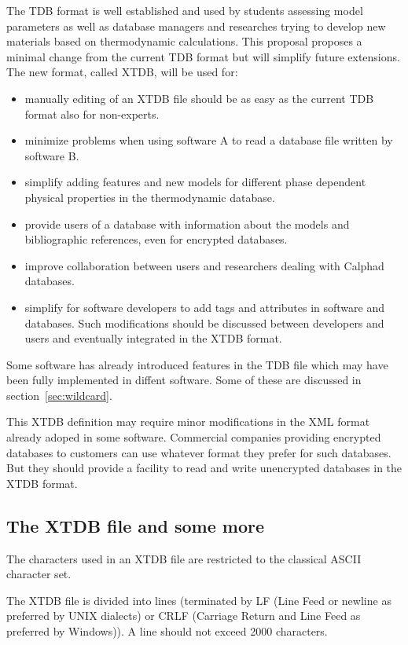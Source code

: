 \documentclass{article}
\begin{document}
The TDB format is well established and used by students assessing
model parameters as well as database managers and researches trying to
develop new materials based on thermodynamic calculations.  This
proposal proposes a minimal change from the current TDB format but
will simplify future extensions.  The new format, called XTDB, will be
used for:
\begin{itemize}
  \item manually editing of an XTDB file should be as easy as the
    current TDB format also for non-experts.
  \item minimize problems when using software A to read a database
    file written by software B.
  \item simplify adding features and new models for different phase
    dependent physical properties in the thermodynamic database.
  \item provide users of a database with information about the models
    and bibliographic references, even for encrypted databases.
  \item improve collaboration between users and researchers dealing
    with Calphad databases.
  \item simplify for software developers to add tags and attributes in
    software and databases.  Such modifications should be discussed
    between developers and users and eventually integrated in the XTDB
    format.
\end{itemize}

Some software has already introduced features in the TDB file which
may have been fully implemented in diffent software.  Some of these
are discussed in section~\ref{sec:wildcard}.

This XTDB definition may require minor modifications in the XML format
already adoped in some software.  Commercial companies providing
encrypted databases to customers can use whatever format they prefer
for such databases.  But they should provide a facility to read and
write unencrypted databases in the XTDB format.

\subsection{The XTDB file and some more}

The characters used in an XTDB file are restricted to the classical
ASCII character set.

The XTDB file is divided into lines (terminated by LF (Line Feed or
newline as preferred by UNIX dialects) or CRLF (Carriage Return and
Line Feed as preferred by Windows)).  A line should not exceed 2000
characters.
\end{document}
